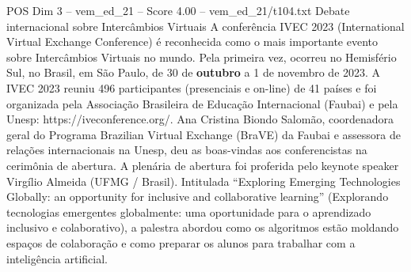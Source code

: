 \begin{textsample}{POS Dim 3 – vem\_ed\_21 – Score 4.00 – vem\_ed\_21/t104.txt}  \label{ex:f3_pos_108}
Debate internacional sobre Intercâmbios Virtuais A conferência IVEC 2023 (International Virtual Exchange Conference) é reconhecida como o mais importante evento sobre Intercâmbios Virtuais no mundo.
Pela primeira vez, ocorreu no Hemisfério Sul, no Brasil, em São Paulo, de 30 de \textbf{outubro} a 1 de novembro de 2023.
A IVEC 2023 reuniu 496 participantes (presenciais e on-line) de 41 países e foi organizada pela Associação Brasileira de Educação Internacional (Faubai) e pela Unesp: https://iveconference.org/.
Ana Cristina Biondo Salomão, coordenadora geral do Programa Brazilian Virtual Exchange (BraVE) da Faubai e assessora de relações internacionais na Unesp, deu as boas-vindas aos conferencistas na cerimônia de abertura.
A plenária de abertura foi proferida pelo keynote speaker Virgílio Almeida (UFMG / Brasil).
Intitulada “Exploring Emerging Technologies Globally: an opportunity for inclusive and collaborative learning” (Explorando tecnologias emergentes globalmente: uma oportunidade para o aprendizado inclusivo e colaborativo), a palestra abordou como os algoritmos estão moldando espaços de colaboração e como preparar os alunos para trabalhar com a inteligência artificial.

\end{textsample}
